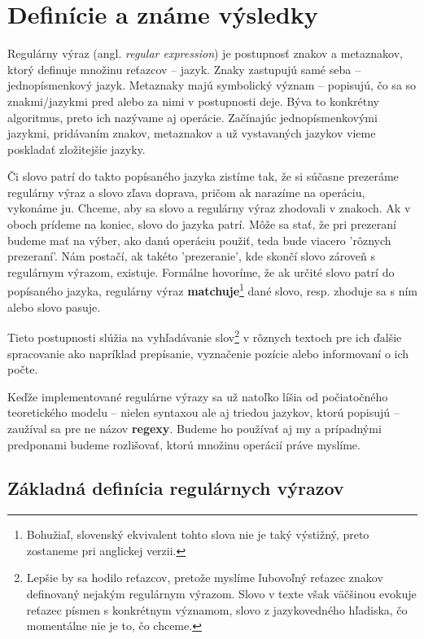 \chapter{Definície a známe výsledky}
\label{chap:kapitola1}

Regulárny výraz (angl. \textit{regular expression}) je postupnosť znakov a metaznakov, ktorý definuje množinu reťazcov -- jazyk. Znaky zastupujú samé seba -- jednopísmenkový jazyk. Metaznaky majú symbolický význam -- popisujú, čo sa so znakmi/jazykmi pred alebo za nimi v postupnosti deje. Býva to konkrétny algoritmus, preto ich nazývame aj operácie. Začínajúc jednopísmenkovými jazykmi, pridávaním znakov, metaznakov a už vystavaných jazykov vieme poskladať zložitejšie jazyky.

Či slovo patrí do takto popísaného jazyka zistíme tak, že si súčasne prezeráme re\-gu\-lár\-ny výraz a slovo zľava doprava, pričom ak narazíme na operáciu, vykonáme ju. Chceme, aby sa slovo a regulárny výraz zhodovali v znakoch. Ak v oboch prídeme na koniec, slovo do jazyka patrí. Môže sa stať, že pri prezeraní budeme mať na výber, ako danú operáciu použiť, teda bude viacero 'rôznych prezeraní'. Nám postačí, ak takéto 'prezeranie', kde skončí slovo zároveň s regulárnym výrazom, existuje. Formálne ho\-vo\-rí\-me, že ak určité slovo patrí do popísaného jazyka, regulárny výraz \textbf{matchuje}\footnote{Bohužiaľ, slovenský ekvivalent tohto slova nie je taký výstižný, preto zostaneme pri anglickej verzii.} dané slovo, resp. zhoduje sa s ním alebo slovo pasuje.

Tieto postupnosti slúžia na vyhľadávanie slov\footnote{Lepšie by sa hodilo reťazcov, pretože myslíme ľubovoľný reťazec znakov definovaný nejakým re\-gu\-lár\-nym výrazom. Slovo v texte však väčšinou evokuje reťazec písmen s konkrétnym významom, slovo z jazykovedného hľadiska, čo momentálne nie je to, čo chceme.} v rôznych textoch pre ich ďalšie spracovanie ako napríklad prepísanie, vyznačenie pozície alebo informovaní o ich počte.

Keďže implementované regulárne výrazy sa už natoľko líšia od počiatočného teo\-re\-tic\-ké\-ho modelu -- nielen syntaxou ale aj triedou jazykov, ktorú popisujú -- zaužíval sa pre ne názov \textbf{regexy}. Budeme ho používať aj my a prípadnými predponami budeme rozlišovať, ktorú množinu operácií práve myslíme.

\section[Zákl. definícia]{Základná definícia regulárnych výrazov}
\label{def}

